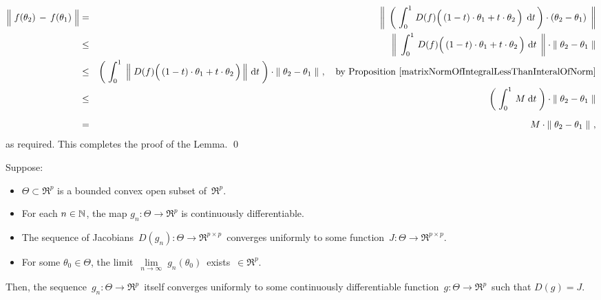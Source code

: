 \begin{eqnarray*}
\left\Vert\; f(\theta_{2}) \, \overset{{\color{white}.}}{-} \, f(\theta_{1}) \;\right\Vert
& = &
	\left\Vert\;\,
		\left(\;\int_{0}^{1}\, D(f)\!\left(\,(1-t)\cdot \theta_{1} \overset{{\color{white}.}}{+} t \cdot \theta_{2} \,\right) \;\d t\,\right)
		\cdot (\theta_{2} - \theta_{1})
		\,\;\right\Vert
\\
& \leq &
	\left\Vert\;\,
		\int_{0}^{1}\, D(f)\!\left(\,(1-t)\cdot \theta_{1} \overset{{\color{white}.}}{+} t \cdot \theta_{2} \,\right) \,\d t
		\,\;\right\Vert
	\cdot 
	\left\Vert\; \theta_{2} - \theta_{1} \;\right\Vert
\\
& \leq &
	\left(\;
		\int_{0}^{1}\;
			\left\Vert\;
				D(f)\!\left(\,(1-t)\cdot \theta_{1} \overset{{\color{white}.}}{+} t \cdot \theta_{2} \,\right) 
				\,\right\Vert
			\,\d t
		\;\right)
	\cdot 
	\left\Vert\; \theta_{2} - \theta_{1} \;\right\Vert\,,
	\quad
	\textnormal{by Proposition \ref{matrixNormOfIntegralLessThanInteralOfNorm}}
\\
& \leq &
	\left(\; \int_{0}^{1}\, M \;\d t \;\right)
	\cdot 
	\left\Vert\; \theta_{2} - \theta_{1} \;\right\Vert
\\
& = &
	\overset{{\color{white}-}}{M} \cdot \left\Vert\; \theta_{2} - \theta_{1} \;\right\Vert\,,
\end{eqnarray*}
as required.
This completes the proof of the Lemma.
\qed


\vskip 1.0cm
\begin{lemma}
\mbox{}\vskip 0.1cm
\noindent
Suppose:
\begin{itemize}
\item
	$\Theta \subset \Re^{p}$ is a bounded convex open subset of \,$\Re^{p}$.
\item
	For each $n\in\mathbb{N}$, the map $g_{n} : \Theta \longrightarrow \Re^{p}$ is continuously differentiable.
\item
	The sequence of Jacobians
	\,$D(g_{n}) : \Theta \longrightarrow \Re^{p \times p}$\,
	converges uniformly to some function
	\,$J : \Theta \longrightarrow \Re^{p \times p}$.
\item
	For some $\theta_{0} \in \Theta$, the limit
	\,$\underset{n\rightarrow\infty}{\lim}\;g_{n}(\theta_{0})$\,
	exists \,$\in \Re^{p}$.
\end{itemize}
Then, the sequence
\,$g_{n} : \Theta \longrightarrow \Re^{p}$\,
itself converges uniformly to some continuously differentiable function
\,$g : \Theta \longrightarrow \Re^{p}$\,
such that $D(g) = J$.
\end{lemma}
\proof

